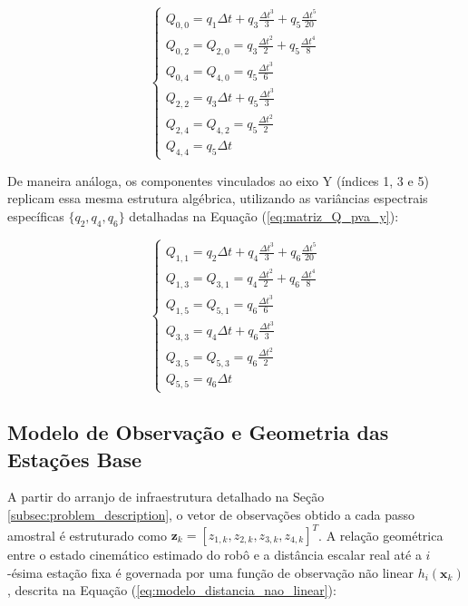 \begin{equation}
    \label{eq:matriz_Q_pva_x}
    \begin{cases}
        Q_{0,0} = q_1\Delta t + q_3\frac{\Delta t^3}{3} + q_5\frac{\Delta t^5}{20} \\
        Q_{0,2} = Q_{2,0} = q_3\frac{\Delta t^2}{2} + q_5\frac{\Delta t^4}{8} \\
        Q_{0,4} = Q_{4,0} = q_5\frac{\Delta t^3}{6} \\
        Q_{2,2} = q_3\Delta t + q_5\frac{\Delta t^3}{3} \\
        Q_{2,4} = Q_{4,2} = q_5\frac{\Delta t^2}{2} \\
        Q_{4,4} = q_5\Delta t
    \end{cases}
\end{equation}

De maneira análoga, os componentes vinculados ao eixo Y (índices 1, 3 e 5) replicam essa mesma estrutura algébrica, utilizando as variâncias espectrais específicas $\{q_2, q_4, q_6\}$ detalhadas na Equação (\ref{eq:matriz_Q_pva_y}):

\begin{equation}
    \label{eq:matriz_Q_pva_y}
    \begin{cases}
        Q_{1,1} = q_2\Delta t + q_4\frac{\Delta t^3}{3} + q_6\frac{\Delta t^5}{20} \\
        Q_{1,3} = Q_{3,1} = q_4\frac{\Delta t^2}{2} + q_6\frac{\Delta t^4}{8} \\
        Q_{1,5} = Q_{5,1} = q_6\frac{\Delta t^3}{6} \\
        Q_{3,3} = q_4\Delta t + q_6\frac{\Delta t^3}{3} \\
        Q_{3,5} = Q_{5,3} = q_6\frac{\Delta t^2}{2} \\
        Q_{5,5} = q_6\Delta t
    \end{cases}
\end{equation}


\subsection{Modelo de Observação e Geometria das Estações Base}
\label{subsec:observation_model}

A partir do arranjo de infraestrutura detalhado na Seção \ref{subsec:problem_description}, o vetor de observações obtido a cada passo amostral é estruturado como $\mathbf{z}_k = [z_{1,k}, z_{2,k}, z_{3,k}, z_{4,k}]^T$. A relação geométrica entre o estado cinemático estimado do robô e a distância escalar real até a $i$-ésima estação fixa é governada por uma função de observação não linear $h_i(\mathbf{x}_k)$, descrita na Equação (\ref{eq:modelo_distancia_nao_linear}):

